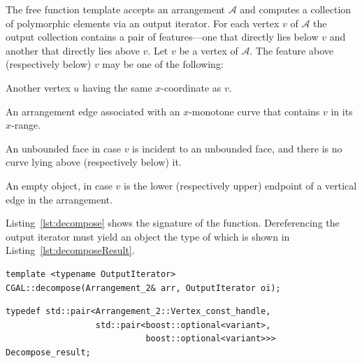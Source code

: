 The free function template  accepts an
arrangement $\mathcal{A}$ and computes a collection of polymorphic
elements via an output iterator. For each vertex $v$ of $\mathcal{A}$
the output collection contains a pair of features---one that directly
lies below $v$ and another that directly lies above $v$. Let $v$ be a
vertex of $\mathcal{A}$. The feature above (respectively below) $v$
may be one of the following:
\begin{compactitem}
\item Another vertex $u$ having the same $x$-coordinate as $v$.
\item An arrangement edge associated with an $x$-monotone curve that
  contains $v$ in its $x$-range.
\item An unbounded face in case $v$ is incident to an unbounded face,
  and there is no curve lying above (respectively below) it.
\item An empty object, in case $v$ is the lower (respectively upper)
  endpoint of a vertical edge in the arrangement.
\end{compactitem}
Listing~\ref{lst:decompose} shows the signature of the
function. Dereferencing the output iterator must yield an object the
type of which is  shown in
Listing~\ref{lst:decomposeResult}.

\begin{lstfloat}
  \begin{lstlisting}[style=cppFramedStyle,basicstyle=\normalsize,%
                     label={lst:decompose},%
                     caption={The signature of the free function that decomposes an arrangement into pseudo trapezoids.}]
template <typename OutputIterator>
CGAL::decompose(Arrangement_2& arr, OutputIterator oi);
  \end{lstlisting}
\end{lstfloat}

\begin{lstfloat}
  \begin{lstlisting}[style=cppFramedStyle,basicstyle=\normalsize,%
                     label={lst:decomposeResult},%
                     caption={The type of an output element of the
                       \cppLstinline{CGAL::decompose()} function shown in
                       Listing~\ref{lst:decompose}.}]
typedef std::pair<Arrangement_2::Vertex_const_handle,
                  std::pair<boost::optional<variant>,
                            boost::optional<variant>>>        Decompose_result;
  \end{lstlisting}
\end{lstfloat}


